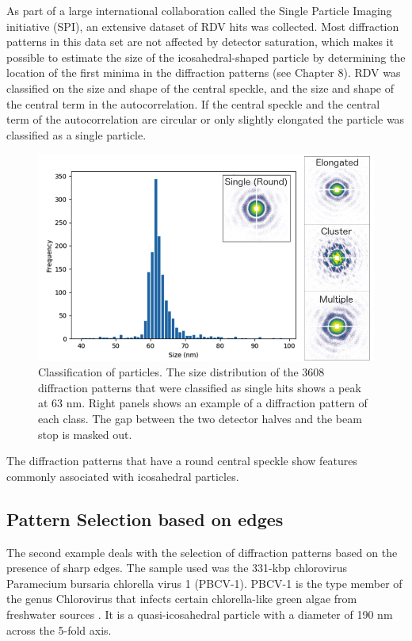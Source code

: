 As part of a large international collaboration called the Single Particle Imaging initiative (SPI)\cite{Aquila2015a}, an extensive dataset of RDV hits was collected. Most diffraction patterns in this data set are not affected by detector saturation, which makes it possible to estimate the size of the icosahedral-shaped particle by determining the location of the first minima in the diffraction patterns (see Chapter 8).
RDV was classified on the size and shape of the central speckle, and the size and shape of the central term in the autocorrelation. If the central speckle and the central term of the autocorrelation are circular or only slightly elongated the particle was classified as a single particle.  

\begin{figure}[!ht]
\centering
\includegraphics[width=120mm]{Chapter_09_Results_RDV.png}
\caption{Classification of particles. The size distribution of the 3608 diffraction patterns that were classified as single hits shows a peak at 63 nm. Right panels shows an  example of a diffraction pattern of each class. The gap between the two detector halves and the beam stop is masked out.}\label{fig:Classes}

\end{figure}

The diffraction patterns that have a round central speckle show features commonly associated with icosahedral particles. 

\subsection{Pattern Selection based on edges}
The second example deals with the selection of diffraction patterns based on the presence of sharp edges. The sample used was the 331-kbp chlorovirus Paramecium bursaria chlorella virus 1 (PBCV-1). PBCV-1 is the type member of the genus Chlorovirus that infects certain chlorella-like green algae from freshwater sources \cite{VanEtten2012}. It is a quasi-icosahedral particle with a diameter of 190 nm across the 5-fold axis.

